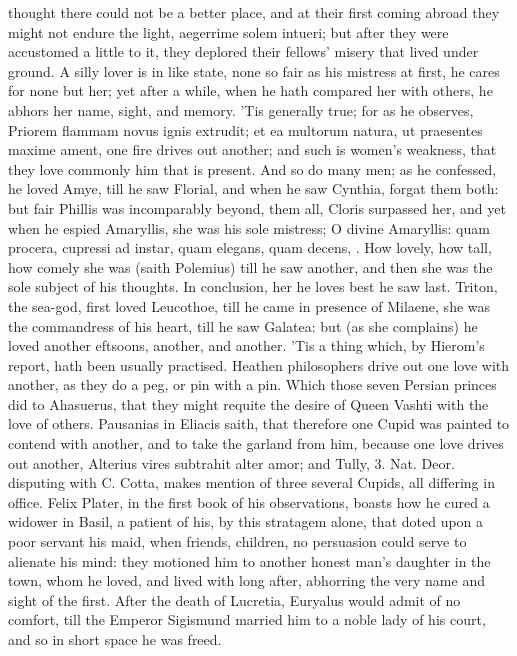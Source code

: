 thought there could not be a better place, and at their first coming
abroad they might not endure the light, aegerrime solem intueri; but
after they were accustomed a little to it, they deplored their
fellows' misery that lived under ground. A silly lover is in like
state, none so fair as his mistress at first, he cares for none but
her; yet after a while, when he hath compared her with others, he
abhors her name, sight, and memory. 'Tis generally true; for as he
observes, Priorem flammam novus ignis extrudit; et ea multorum
natura, ut praesentes maxime ament, one fire drives out another; and
such is women's weakness, that they love commonly him that is present.
And so do many men; as he confessed, he loved Amye, till he saw
Florial, and when he saw Cynthia, forgat them both: but fair Phillis
was incomparably beyond, them all, Cloris surpassed her, and yet when
he espied Amaryllis, she was his sole mistress; O divine Amaryllis:
quam procera, cupressi ad instar, quam elegans, quam decens, \etc{}. How
lovely, how tall, how comely she was (saith Polemius) till he saw
another, and then she was the sole subject of his thoughts. In
conclusion, her he loves best he saw last. Triton, the sea-god,
first loved Leucothoe, till he came in presence of Milaene, she was the
commandress of his heart, till he saw Galatea: but (as she
complains) he loved another eftsoons, another, and another. 'Tis a
thing which, by Hierom's report, hath been usually practised.
Heathen philosophers drive out one love with another, as they do
a peg, or pin with a pin. Which those seven Persian princes did to
Ahasuerus, that they might requite the desire of Queen Vashti with the
love of others. Pausanias in Eliacis saith, that therefore one Cupid
was painted to contend with another, and to take the garland from him,
because one love drives out another, Alterius vires subtrahit
alter amor; and Tully, 3. Nat. Deor. disputing with C. Cotta, makes
mention of three several Cupids, all differing in office. Felix Plater,
in the first book of his observations, boasts how he cured a widower in
Basil, a patient of his, by this stratagem alone, that doted upon a
poor servant his maid, when friends, children, no persuasion could
serve to alienate his mind: they motioned him to another honest man's
daughter in the town, whom he loved, and lived with long after,
abhorring the very name and sight of the first. After the death of
Lucretia, Euryalus would admit of no comfort, till the Emperor
Sigismund married him to a noble lady of his court, and so in short
space he was freed.

